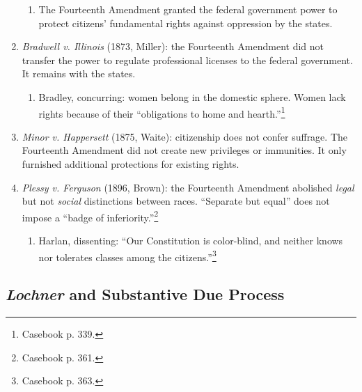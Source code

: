\begin{enumerate}
\begin{enumerate}
        \item The Fourteenth Amendment granted the federal government power to 
        protect citizens' fundamental rights against oppression by the states.
    \end{enumerate}
    \item \emph{Bradwell v. Illinois} (1873, Miller): the Fourteenth Amendment 
    did not transfer the power to regulate professional licenses to the 
    federal government. It remains with the states.
    \begin{enumerate}
        \item Bradley, concurring: women belong in the domestic sphere. Women 
        lack rights because of their ``obligations to home and 
        hearth.''\footnote{Casebook p. 339.}
    \end{enumerate}
    \item \emph{Minor v. Happersett} (1875, Waite): citizenship does not 
    confer suffrage. The Fourteenth Amendment did not create new privileges or 
    immunities. It only furnished additional protections for existing rights.
    \item \emph{Plessy v. Ferguson} (1896, Brown): the Fourteenth Amendment 
    abolished \emph{legal} but not \emph{social} distinctions between races.  
    ``Separate but equal'' does not impose a ``badge of 
    inferiority.''\footnote{Casebook p. 361.}
    \begin{enumerate}
        \item Harlan, dissenting: ``Our Constitution is color-blind, 
        and neither knows nor tolerates classes among the 
        citizens.''\footnote{Casebook p. 363.}
    \end{enumerate}
\end{enumerate}

\subsection{\emph{Lochner} and Substantive Due Process}

